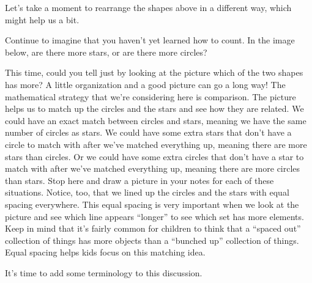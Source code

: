 \documentclass{ximera}
\begin{document}
Let's take a moment to rearrange the shapes above in a different way, which might help us a bit.

\begin{question} \label{oneOneLine}
Continue to imagine that you haven't yet learned how to count. In the image below, are there more stars, or 
are there 
more circles?

\begin{center}
\end{center}

\begin{multipleChoice}
\end{multipleChoice}
\end{question}

This time, could you tell just by looking at the picture which of the two shapes has more? A little organization and a good picture can go a long way!  The mathematical strategy that we're considering here is comparison. The picture helps us to match up the circles and the stars and see how they are related. We could have an exact match between circles and stars, meaning we have the same number of circles as stars. We could have some extra stars that don't have a circle to match with after we've matched everything up, meaning there are more stars than circles. Or we could have some extra circles that don't have a star to match with after we've matched everything up, meaning there are more circles than stars. Stop here and draw a picture in your notes for each of these situations. Notice, too, that we lined up the circles and the stars with equal spacing everywhere. This equal spacing is very important when we look at the picture and see which line appears ``longer'' to see which set has more elements. Keep in mind that it's fairly common for children to think that a ``spaced out'' collection of things has more objects than a ``bunched up'' collection of things. Equal spacing helps kids focus on this matching idea.

It's time to add some terminology to this discussion.
\end{document}

